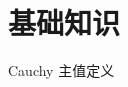\chapter{基础知识}\label{chap:fundamental}

\begin{definition}\label{def:pv}
	Cauchy 主值定义
\end{definition}